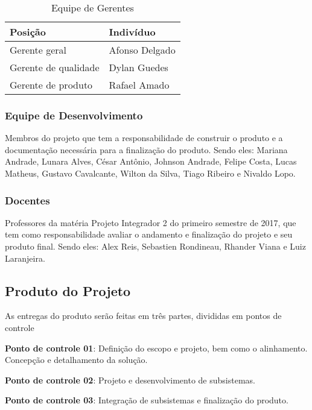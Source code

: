 \begin{table}[]
\centering
\caption{Equipe de Gerentes}
\label{equipe_gerentes}
\begin{tabular}{|l|l|}
\hline
Posição              & Indivíduo      \\ \hline
Gerente geral        & Afonso Delgado \\ \hline
Gerente de qualidade & Dylan Guedes   \\ \hline
Gerente de produto   & Rafael Amado   \\ \hline
\end{tabular}
\end{table}

\subsubsection{Equipe de Desenvolvimento}
Membros do projeto que tem a responsabilidade de construir o produto e a 
documentação necessária para a finalização do produto. Sendo eles: Mariana 
Andrade, Lunara Alves, César Antônio, Johnson Andrade, Felipe Costa, Lucas 
Matheus, Gustavo Cavalcante, Wilton da Silva, Tiago Ribeiro e Nivaldo Lopo.


\subsubsection{Docentes}
Professores da matéria Projeto Integrador 2 do primeiro semestre de 2017, que 
tem como responsabilidade avaliar o andamento e finalização do projeto e seu 
produto final. Sendo eles: Alex Reis, Sebastien Rondineau, Rhander Viana e 
Luiz Laranjeira.

\subsection{Produto do Projeto}
As entregas do produto serão feitas em três partes, divididas em pontos de controle

\textbf{Ponto de controle 01}: Definição do escopo e projeto, bem como o 
alinhamento. Concepção e detalhamento da solução.

\textbf{Ponto de controle 02}: Projeto e desenvolvimento de subsistemas.


\textbf{Ponto de controle 03}: Integração de subsistemas e finalização do 
produto.

